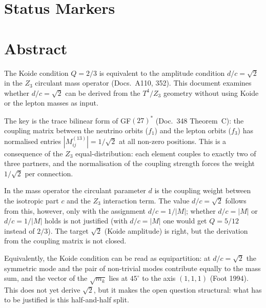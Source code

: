 \providecommand{\BM}{\textbf{[B]}}
\providecommand{\KM}{\textbf{[K]}}
\providecommand{\SM}{\textbf{[S]}}
\providecommand{\QM}{\textbf{[Q]}}

{}

\section*{Status Markers}


\section*{Abstract}

The Koide condition $Q = 2/3$ is equivalent to the amplitude condition
$d/c = \sqrt{2}$ in the $Z_3$ circulant mass operator (Docs.~A110, 352).
This document examines whether $d/c = \sqrt{2}$ can be derived from the
$T^4/Z_3$ geometry without using Koide or the lepton masses as input.

The key is the trace bilinear form of GF$(27)^*$ (Doc.~348 Theorem~C):
the coupling matrix between the neutrino orbits ($f_1$) and the lepton orbits ($f_3$)
has normalised entries $|M^{(13)}_{ij}| = 1/\sqrt{2}$ at all non-zero positions.
This is a consequence of the $Z_3$ equal-distribution: each element couples to
exactly two of three partners, and the normalisation of the coupling strength
forces the weight $1/\sqrt{2}$ per connection.

In the mass operator the circulant parameter $d$ is the coupling weight between
the isotropic part $c$ and the $Z_3$ interaction term. The value
$d/c = \sqrt{2}$ follows from this, however, only with the assignment
$d/c = 1/|M|$; whether $d/c = |M|$ or $d/c = 1/|M|$ holds is not justified
(with $d/c = |M|$ one would get $Q = 5/12$ instead of $2/3$). The target
$\sqrt{2}$ (Koide amplitude) is right, but the derivation from the coupling
matrix is not closed.

Equivalently, the Koide condition can be read as equipartition: at
$d/c = \sqrt{2}$ the symmetric mode and the pair of non-trivial modes contribute
equally to the mass sum, and the vector of the $\sqrt{m_k}$ lies at $45^\circ$
to the axis $(1,1,1)$ (Foot 1994). This does not yet derive $\sqrt{2}$, but it
makes the open question structural: what has to be justified is this half-and-half
split.

